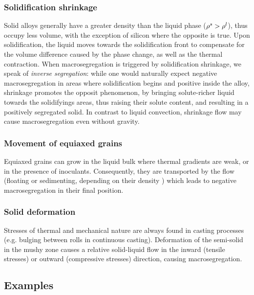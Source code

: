 \subsubsection*{Solidification shrinkage}
Solid alloys generally have a greater density than the liquid phase ($\rho^s > \rho^l$), 
thus occupy less volume, with the exception of silicon where the opposite is true. 
Upon solidification, the liquid moves towards the solidification front to compensate for the volume 
difference caused by the phase change, as well as the thermal contraction. When macrosegregation is 
triggered by solidification shrinkage, we speak of \emph{inverse segregation}: while one would naturally expect 
negative macrosegregation in areas where solidification begins and positive inside the alloy, shrinkage 
promotes the opposit phenomenon, by bringing solute-richer liquid towards the solidifyings areas, thus raising 
their solute content, and resulting in a positively segregated solid.
In contrast to liquid convection, shrinkage flow may cause macrosegregation even without gravity.
%
%
\subsubsection*{Movement of equiaxed grains}
%
Equiaxed grains can grow in the liquid bulk where thermal gradients are weak, or in the presence of inoculants. 
Consequently, they are transported by the flow (floating or sedimenting, depending on their density 
\citep{beckermann_modelling_2002}) which leads to negative macrosegregation in their final position.
%
%
\subsubsection{Solid deformation} 
%
Stresses of thermal and mechanical nature are always found in casting processes 
(e.g. bulging between rolls in continuous casting). 
Deformation of the semi-solid in the mushy zone causes a relative solid-liquid 
flow in the inward (tensile stresses) or outward (compressive stresses) direction, causing macrosegregation.
%
%
\subsection{Examples}
%
